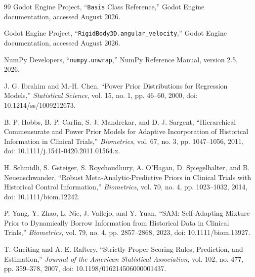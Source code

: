 \documentclass[11pt]{article}
\begin{document}
\begin{thebibliography}{99}
        Godot Engine Project,
        ``\texttt{Basis} Class Reference,''
        Godot Engine documentation, accessed August 2026.

        Godot Engine Project,
        ``\texttt{RigidBody3D.angular\_velocity},''
        Godot Engine documentation, accessed August 2026.

        NumPy Developers,
        ``\texttt{numpy.unwrap},''
        NumPy Reference Manual, version 2.5, 2026.



        J. G. Ibrahim and M.-H. Chen,
        ``Power Prior Distributions for Regression Models,''
        \emph{Statistical Science}, vol. 15, no. 1, pp. 46--60, 2000,
        doi: 10.1214/ss/1009212673.

        B. P. Hobbs, B. P. Carlin, S. J. Mandrekar, and D. J. Sargent,
        ``Hierarchical Commensurate and Power Prior Models for Adaptive Incorporation of
        Historical Information in Clinical Trials,''
        \emph{Biometrics}, vol. 67, no. 3, pp. 1047--1056, 2011,
        doi: 10.1111/j.1541-0420.2011.01564.x.

        H. Schmidli, S. Gsteiger, S. Roychoudhury, A. O'Hagan, D. Spiegelhalter, and
        B. Neuenschwander,
        ``Robust Meta-Analytic-Predictive Priors in Clinical Trials with Historical Control
        Information,''
        \emph{Biometrics}, vol. 70, no. 4, pp. 1023--1032, 2014,
        doi: 10.1111/biom.12242.

        P. Yang, Y. Zhao, L. Nie, J. Vallejo, and Y. Yuan,
        ``SAM: Self-Adapting Mixture Prior to Dynamically Borrow Information from Historical
        Data in Clinical Trials,''
        \emph{Biometrics}, vol. 79, no. 4, pp. 2857--2868, 2023,
        doi: 10.1111/biom.13927.

        T. Gneiting and A. E. Raftery,
        ``Strictly Proper Scoring Rules, Prediction, and Estimation,''
        \emph{Journal of the American Statistical Association}, vol. 102, no. 477,
        pp. 359--378, 2007,
        doi: 10.1198/016214506000001437.

    \end{thebibliography}
\end{document}
